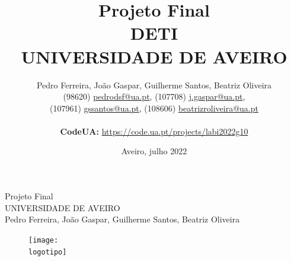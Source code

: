 \documentclass[a4paper, 11pt, oneside]{report}
\begin{document}
\def\titulo{Projeto Final}
\def\data{Aveiro, julho 2022}
\def\autores{Pedro Ferreira, João Gaspar, Guilherme Santos, Beatriz Oliveira}
\def\autorescontactos{(98620) \href{mailto:pedrodsf@ua.pt}{pedrodsf@ua.pt}, (107708) \href{mailto:j.gaspar@ua.pt}{j.gaspar@ua.pt},\\(107961) \href{mailto:gssantos@ua.pt}{gssantos@ua.pt}, (108606) \href{mailto:beatrizroliveira@ua.pt}{beatrizroliveira@ua.pt}}
\def\codeua{\textbf{CodeUA:} \url{https://code.ua.pt/projects/labi2022g10}}
\def\departamento{DETI}
\def\empresa{UNIVERSIDADE DE AVEIRO}
\def\logotipo{ua.pdf}

\begin{titlepage}
\begin{center}
\vspace*{50mm}
{\Huge \titulo}\\ 
\vspace{10mm}
{\Large \empresa}\\
\vspace{10mm}
{\LARGE \autores}\\ 
\vspace{30mm}
\begin{figure}[h]
\center
\texttt{[image: \\logotipo]}
\end{figure}
\vspace{30mm}
\end{center}
\end{titlepage}

\title{
{\Huge\textbf{\titulo}}\\
{\Large \departamento\\ \empresa}
}
\author{
\autores \\
\autorescontactos \\\\
\codeua
}
\date{\data}
\maketitle



\clearpage
\end{document}
